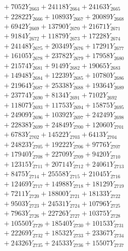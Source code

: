 \documentclass[a4paper,10pt]{article}
\begin{document}
{\begin{align}
&\;  + 7052 Y_{2663} + 24118 Y_{2664} + 24163 Y_{2665} \\[0.3ex]
&\;  + 22822 Y_{2666} + 10893 Y_{2667} + 20089 Y_{2668} \\[0.5ex]\allowbreak
&\;  + 6942 Y_{2669} + 13790 Y_{2670} + 21671 Y_{2671} \\[0.3ex]
&\;  + 9184 Y_{2672} + 11879 Y_{2673} + 17228 Y_{2674} \\[0.3ex]
&\;  + 24148 Y_{2675} + 20349 Y_{2676} + 17291 Y_{2677} \\[0.3ex]
&\;  + 16105 Y_{2678} + 23782 Y_{2679} + 17958 Y_{2680} \\[0.3ex]
&\;  + 21574 Y_{2681} + 9149 Y_{2682} + 19065 Y_{2683} \\[0.3ex]
&\;  + 14948 Y_{2684} + 12239 Y_{2685} + 10780 Y_{2686} \\[0.3ex]
&\;  + 21964 Y_{2687} + 25338 Y_{2688} + 19364 Y_{2689} \\[0.3ex]
&\;  + 23774 Y_{2690} + 8134 Y_{2691} + 7102 Y_{2692} \\[0.3ex]
&\;  + 11807 Y_{2693} + 11753 Y_{2694} + 15875 Y_{2695} \\[0.3ex]
&\;  + 24909 Y_{2696} + 10392 Y_{2697} + 24249 Y_{2698} \\[0.5ex]\allowbreak
&\;  + 22838 Y_{2699} + 24849 Y_{2700} + 12060 Y_{2701} \\[0.3ex]
&\;  + 6783 Y_{2702} + 14522 Y_{2703} + 6413 Y_{2704} \\[0.3ex]
&\;  + 24823 Y_{2705} + 19222 Y_{2706} + 9776 Y_{2707} \\[0.3ex]
&\;  + 17940 Y_{2708} + 22709 Y_{2709} + 9420 Y_{2710} \\[0.3ex]
&\;  + 12315 Y_{2711} + 20714 Y_{2712} + 24061 Y_{2713} \\[0.3ex]
&\;  + 8475 Y_{2714} + 25558 Y_{2715} + 21045 Y_{2716} \\[0.3ex]
&\;  + 12469 Y_{2717} + 14988 Y_{2718} + 18129 Y_{2719} \\[0.3ex]
&\;  + 7211 Y_{2720} + 18800 Y_{2721} + 18133 Y_{2722} \\[0.3ex]
&\;  + 9503 Y_{2723} + 24531 Y_{2724} + 10796 Y_{2725} \\[0.3ex]
&\;  + 7963 Y_{2726} + 22726 Y_{2727} + 10375 Y_{2728} \\[0.5ex]\allowbreak
&\;  + 10550 Y_{2729} + 18540 Y_{2730} + 10153 Y_{2731} \\[0.3ex]
&\;  + 22269 Y_{2732} + 18532 Y_{2733} + 23367 Y_{2734} \\[0.3ex]
&\;  + 24326 Y_{2735} + 24533 Y_{2736} + 15507 Y_{2737} \\[0.3ex]

\end{align}}
\end{document}

